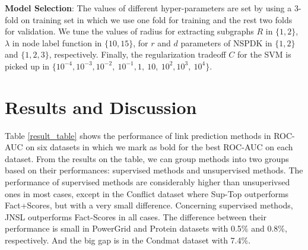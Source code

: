 \documentclass[runningheads,a4paper]{llncs}
\begin{document}
\textbf{Model Selection}: The values of different hyper-parameters are set by using a 3-fold on training set in which we use one fold for training and the rest two folds for validation. We tune the values of radius for extracting subgraphs $R$ in $\lbrace 1, 2 \rbrace$, $\lambda$ in node label function in $\lbrace 10, 15 \rbrace$, for $r$ and $d$ parameters of NSPDK in $\lbrace  1, 2 \rbrace$ and $\lbrace  1, 2, 3 \rbrace$, respectively. Finally, the regularization tradeoff $C$ for the SVM is picked up in $\lbrace 10^{-4}, 10^{-3}, 10^{-2},\ 10^{-1}, 1,\ 10,\ 10^2, 10^3,\ 10^4 \rbrace$.

\section{Results and Discussion}
Table \ref{result_table} shows the performance of link prediction methods in ROC-AUC on six datasets in which we mark as bold for the best ROC-AUC on each dataset. From the results on the table, we can group methods into two groups based on their performances: supervised methods and unsupervised methods. The performance of supervised methods are considerably higher than unsuperivsed ones in most cases, except in the Conflict dataset where Sup-Top outperforms Fact+Scores, but with a very small difference. Concerning supervised methods, JNSL outperforms Fact-Scores in all cases. The difference between their performance is small in PowerGrid and Protein datasets with 0.5$\%$ and 0.8$\%$, respectively. And the big gap is in the Condmat dataset with 7.4$\%$. 
\end{document}
